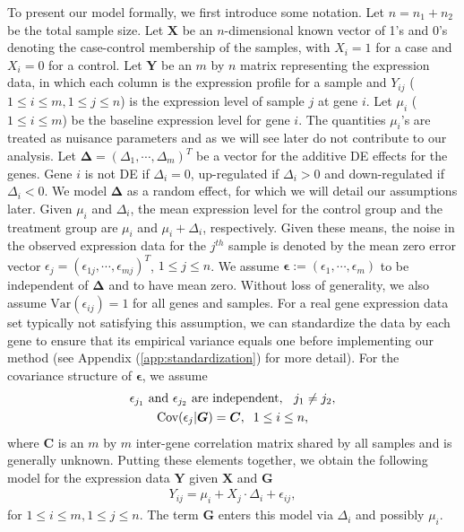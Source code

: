 	To present our model formally, we first introduce some notation. Let $n=n_1+n_2$ be the total
	sample size. Let $\bm X$ be an $n$-dimensional known vector of 1's and 0's denoting the 
	case-control
	membership of the samples, with $X_i=1$ for a case and $X_i=0$ for a control. Let $\bm Y$ be an 
	$m$
	by $n$ matrix representing the expression data, in which each column is the expression profile 
	for a
	sample and $Y_{ij}$ ($1\le i\le m, 1\le j\le n$) is the expression level of sample $j$ at gene
	$i$. Let $\mu_i$ ($1\le i\le m$) be the baseline expression level for gene $i$. The quantities 
	$\mu_i$'s are
	treated as nuisance parameters and as we will see later do not contribute to our analysis. Let 
	$\bm
	\Delta=(\Delta_1, \cdots, \Delta_m)^T$ be a vector for the additive DE effects for the genes. 
	Gene
	$i$ is not DE if $\Delta_i=0$, up-regulated if $\Delta_i >0 $ and down-regulated if 
	$\Delta_i<0$. We
	model $\bm \Delta$ as a random effect, for which we will detail our assumptions later. Given 
	$\mu_i$
	and $\Delta_i$, the mean expression level for the control group and the treatment group are
	$\mu_i$ and $\mu_i+\Delta_i$, respectively. Given these means, the noise in the observed 
	expression
	data for the $j^{th}$ sample is denoted by the mean zero error vector
	$\epsilon_j=(\epsilon_{1j},\cdots,\epsilon_{mj})^T$, $1\le j\le n$. We assume
	$\bm\epsilon:=(\epsilon_1,\cdots,\epsilon_m)$ to be independent of $\bm \Delta$ and to have mean
	zero. Without loss of generality, we also assume $\mbox{Var}(\epsilon_{ij})=1$ for all genes and
	samples. For a real gene expression data set typically not satisfying this assumption, we can
	standardize the data by each gene to ensure that its empirical variance equals one before 
	implementing our method (see Appendix (\ref{app:standardization}) for more detail). For the 
	covariance structure of $\bm \epsilon$, we assume 
	\begin{gather}
	\text{$\epsilon_{j_1}$ and $\epsilon_{j_2}$ are independent, \;\;$j_1\ne
		j_2$},\label{eq:gene_indep}\\
	\mbox{Cov}(\epsilon_j|\bm G)=\bm C, \;\;1\le i\le n,\label{eq:gene_cor}
	\end{gather}
	where $\bm C$ is an $m$ by $m$ inter-gene correlation matrix shared by all samples and is
	generally unknown. Putting these elements together, we obtain the following model for the 
	expression data $\bm Y$
	given $\bm X$ and $\bm G$ 
	\begin{align}
	\label{eq:Ymodel}
	Y_{ij} = \mu_i + X_j\cdot\Delta_i + \epsilon_{ij},
	\end{align}
	for $1\le i\le m, 1\le j\le n$. The term $\bm G$ enters this model via $\Delta_i$ and possibly 
	$\mu_i$.
	
